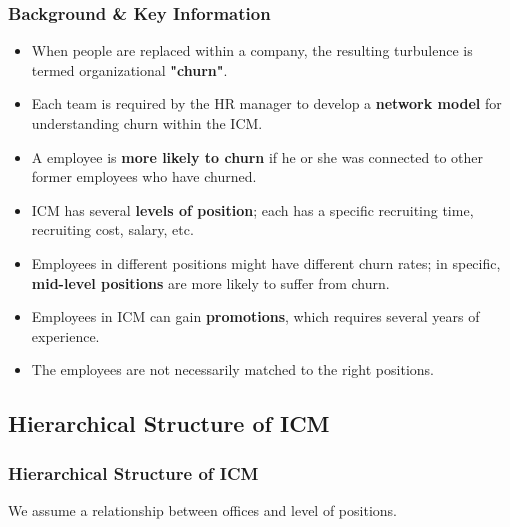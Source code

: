 \documentclass{beamer}
\begin{document}
\begin{frame}
\frametitle{Background \& Key Information}
\begin{itemize}
\item When people are replaced within a company, the resulting turbulence is termed organizational {\bf "churn"}.
\item Each team is required by the HR manager to develop a {\bf network model} for understanding churn within the ICM.
\item A employee is {\bf more likely to churn} if he or she was connected to other former employees who have churned.
\item ICM has several {\bf levels of position}; each has a specific recruiting time, recruiting cost, salary, etc.
\item Employees in different positions might have different churn rates; in specific, {\bf mid-level positions} are more likely to suffer from churn.
\item Employees in ICM can gain {\bf promotions}, which requires several years of experience.
\item The employees are not necessarily matched to the right positions.
\end{itemize}
\end{frame}

\subsection{Hierarchical Structure of ICM}
\begin{frame}
\frametitle{Hierarchical Structure of ICM}

We assume a relationship between offices and level of positions.

\end{frame}

\end{document}
